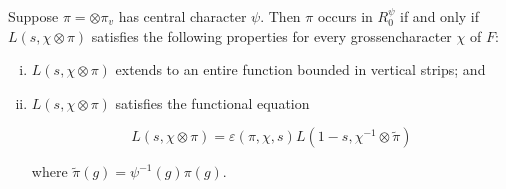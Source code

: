 \begin{theorem}\label{thm:6.18}

Suppose $\pi = \otimes \pi_v$ has central character $\psi$. Then $\pi$ occurs in $R_0^{\psi}$ if and only if $L(s, \chi \otimes \pi)$ satisfies the following properties for every grossencharacter $\chi$ of $F$:

\begin{enumerate}[(i)]

\item $L(s, \chi \otimes \pi)$ extends to an entire function bounded in vertical strips; and

\item $L(s, \chi \otimes \pi)$ satisfies the functional equation

\begin{equation}\label{eq:6.44}
L(s, \chi \otimes \pi) = \varepsilon(\pi, \chi, s) L(1 - s, \chi^{-1} \otimes \tilde{\pi})\tag{6.44}
\end{equation}

where $\tilde{\pi}(g) = \psi^{-1}(g)\pi(g)$.

\end{enumerate}

\end{theorem}

